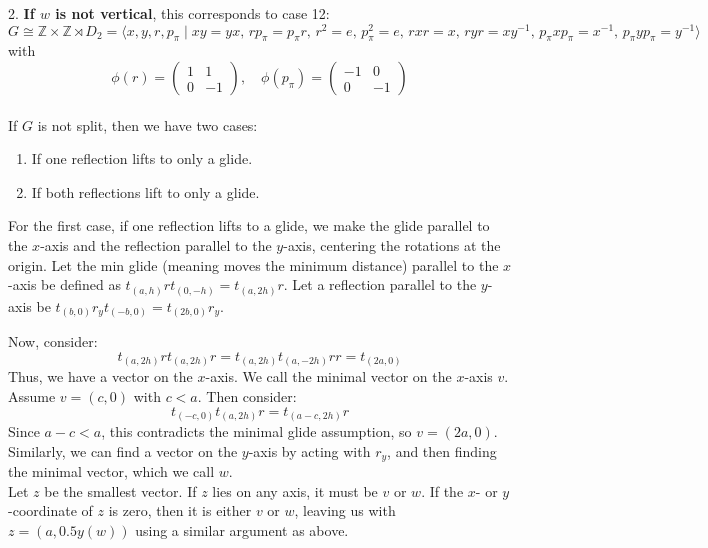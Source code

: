 \documentclass[12pt, letterpaper]{article}
\theoremstyle{definition}
\begin{document}
2. \textbf{If \( w \) is not vertical}, this corresponds to case 12:
   \[
   G \cong \mathbb{Z} \times \mathbb{Z} \rtimes D_2 = \langle x, y, r, p_\pi \mid xy = yx, \, rp_\pi = p_\pi r, \, r^2 = e, \, p_\pi^2 = e, \, r x r = x, \, r y r = x y^{-1}, \, p_\pi x p_\pi = x^{-1}, \, p_\pi y p_\pi = y^{-1} \rangle
   \]
   with
   \[
   \phi(r) = \begin{pmatrix} 1 & 1 \\ 0 & -1 \end{pmatrix}, \quad \phi(p_\pi) = \begin{pmatrix} -1 & 0 \\ 0 & -1 \end{pmatrix}
   \]
\phantom{text}\\
If \( G \) is not split, then we have two cases:

\begin{enumerate}
    \item If one reflection lifts to only a glide.
    \item If both reflections lift to only a glide.
\end{enumerate}

For the first case, if one reflection lifts to a glide, we make the glide parallel to the \( x \)-axis and the reflection parallel to the \( y \)-axis, centering the rotations at the origin.
Let the min glide (meaning moves the minimum distance) parallel to the \( x \)-axis be defined as \( t_{(a,h)}rt_{(0,-h)} = t_{(a,2h)}r \). Let a reflection parallel to the \( y \)-axis be \( t_{(b,0)}r_y t_{(-b,0)} = t_{(2b,0)}r_y \).

Now, consider:
\[
t_{(a,2h)}r t_{(a,2h)}r = t_{(a,2h)} t_{(a,-2h)} rr = t_{(2a,0)}
\]
Thus, we have a vector on the \( x \)-axis. We call the minimal vector on the \( x \)-axis \( v \). Assume \( v = (c,0) \) with \( c < a \). Then consider:
\[
t_{(-c,0)} t_{(a,2h)} r = t_{(a-c,2h)} r
\]
Since \( a - c < a \), this contradicts the minimal glide assumption, so \( v = (2a,0) \).\\
Similarly, we can find a vector on the \( y \)-axis by acting with \( r_y \), and then finding the minimal vector, which we call \( w \).\\
Let \( z \) be the smallest vector. If \( z \) lies on any axis, it must be \( v \) or \( w \). If the \( x \)- or \( y \)-coordinate of \( z \) is zero, then it is either \( v \) or \( w \), leaving us with \( z = (a, 0.5y(w)) \) using a similar argument as above. 
\end{document}
